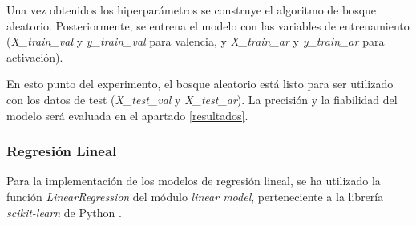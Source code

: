 \documentclass[12pt,a4paper,Spanish]{article}
\begin{document}
Una vez obtenidos los hiperparámetros se construye el algoritmo de bosque aleatorio. Posteriormente, se entrena el modelo con las variables de entrenamiento (\textit{X\_train\_val} y \textit{y\_train\_val} para valencia, y \textit{X\_train\_ar} y \textit{y\_train\_ar} para activación).
\newline

En esto punto del experimento, el bosque aleatorio está listo para ser utilizado con los datos de test (\textit{X\_test\_val} y \textit{X\_test\_ar}). La precisión y la fiabilidad del modelo será evaluada en el apartado \ref{resultados}.

\subsubsection{Regresión Lineal}
Para la implementación de los modelos de regresión lineal, se ha utilizado la función \textit{LinearRegression} del módulo \textit{linear model}, perteneciente a la librería \textit{scikit-learn} de Python \cite{scikit-learn}.
\newline
\end{document}
